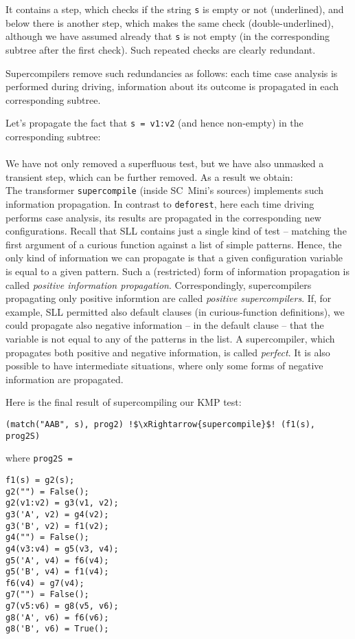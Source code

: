 It contains a step, which checks if the string \texttt{s} is empty or not (underlined),
and below there is another step, which makes the same check (double-underlined),
although we have assumed already that \texttt{s} is not empty 
(in the corresponding subtree after the first check). 
Such repeated checks are clearly redundant.

Supercompilers remove such redundancies as follows:
each time case analysis is performed during driving,
information about its outcome is propagated in each corresponding subtree.

Let's propagate the fact that \texttt{s = v1:v2} (and hence non-empty) in the corresponding subtree:\\
\\
We have not only removed a superfluous test, but we have also unmasked
a transient step, which can be further removed.
As a result we obtain:\\


The transformer \texttt{supercompile} (inside SC~Mini's sources) implements such information propagation.
In contrast to \texttt{deforest}, here each time driving performs case analysis,
its results are propagated in the corresponding new configurations.
Recall that SLL contains just a single kind of test -- matching the first argument of 
a curious function against a list of simple patterns.
Hence, the only kind of information we can propagate is that
a given configuration variable is equal to a given pattern.
Such a (restricted) form of information propagation is 
called \emph{positive information propagation}.
Correspondingly, supercompilers propagating only positive informtion
are called \emph{positive supercompilers}.
If, for example, SLL permitted also default clauses
(in curious-function definitions), we could propagate 
also negative information -- in the default clause -- that
the variable is not equal to any of the patterns in the list.
A supercompiler, which propagates both positive and negative information,
is called \emph{perfect}. It is also possible to have intermediate 
situations, where only some forms of negative information are propagated.

Here is the final result of supercompiling our KMP test:
\begin{lstlisting}[language=sll,escapechar=!]
(match("AAB", s), prog2) !$\xRightarrow{supercompile}$! (f1(s), prog2S)
\end{lstlisting}
where \texttt{prog2S = }
\begin{lstlisting}[language=sll]
f1(s) = g2(s);
g2("") = False();
g2(v1:v2) = g3(v1, v2);
g3('A', v2) = g4(v2);
g3('B', v2) = f1(v2);
g4("") = False();
g4(v3:v4) = g5(v3, v4);
g5('A', v4) = f6(v4);
g5('B', v4) = f1(v4);
f6(v4) = g7(v4);
g7("") = False();
g7(v5:v6) = g8(v5, v6);
g8('A', v6) = f6(v6);
g8('B', v6) = True();
\end{lstlisting}


